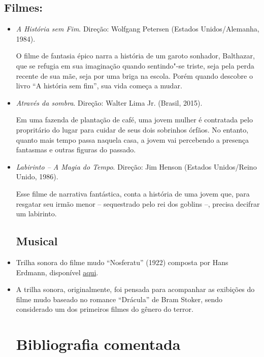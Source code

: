 \documentclass[12pt]{extarticle}
\begin{document}
\subsection{Filmes:}
\begin{itemize}
\item \textit{A História sem Fim}. Direção: Wolfgang Petersen (Estados Unidos/Alemanha, 1984).

O filme de fantasia épico narra a história de um garoto sonhador, Balthazar, que se refugia 
em sua imaginação quando sentindo"-se triste, seja pela perda recente de sua mãe, seja por 
uma briga na escola. Porém quando descobre o livro ``A história sem fim'', sua vida começa 
a mudar. 

\item \textit{Através da sombra}. Direção: Walter Lima Jr. (Brasil, 2015).

Em uma fazenda de plantação de café, uma jovem mulher é contratada pelo propritário do lugar para 
cuidar de seus dois sobrinhos órfãos. No entanto, quanto mais tempo passa naquela casa, a jovem vai 
percebendo a presença fantasmas e outras figuras do passado.

\item \textit{Labirinto – A Magia do Tempo}. Direção: Jim Henson (Estados Unidos/Reino Unido, 1986).

Esse filme de narrativa fantástica, conta a história de uma jovem que, para resgatar seu irmão 
menor -- sequestrado pelo rei dos goblins --, precisa decifrar um labirinto.

\subsection{Musical}

\item Trilha sonora do filme mudo ``Nosferatu'' (1922) composta por Hans Erdmann, disponível \href{https://www.youtube.com/watch?v=NcH38cHjxoM&list=PL8719CBB5D13FFBCA&ab_channel=Billena}{aqui}.

\item A trilha sonora, originalmente, foi pensada para acompanhar as exibições do filme mudo baseado 
no romance ``Drácula'' de Bram Stoker, sendo considerado um dos primeiros filmes do gênero do 
terror.

\section{Bibliografia comentada}


\end{itemize}
\end{document}
